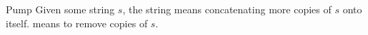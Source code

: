 \documentclass[math]{amznotes}
\begin{document}


\begin{dfnbox}{Pump}{}
    Given some string $s$,  the string means concatenating more copies of $s$ onto itself.  means to remove copies of $s$.
\end{dfnbox}
\end{document}
